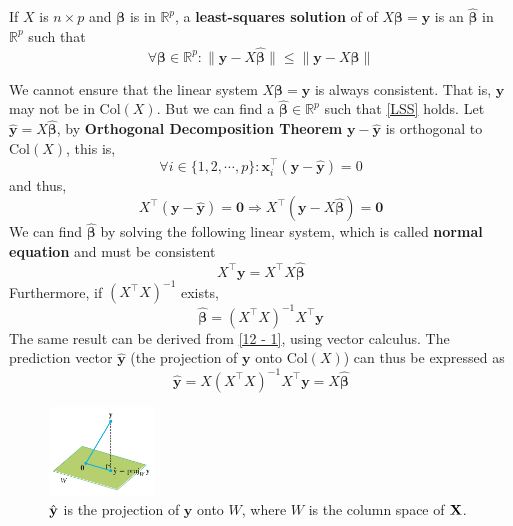 \begin{Def}\label{def-lse}
If $X$ is $n \times p$ and $\pmb{\beta}$ is in $\mathbb{R}^p$, a \textbf{least-squares solution} of of $X\pmb{\beta} = \mathbf{y}$ is an $\hat{\pmb{\beta}}$ in $\mathbb{R}^p$ such that
\begin{equation} \label{LSS}
    \forall \pmb{\beta} \in \mathbb{R}^p: \lVert \mathbf{y} - X\hat{\pmb{\beta}} \rVert \leq \lVert \mathbf{y} - X{\pmb{\beta}} \rVert
\end{equation}
\end{Def}
\noindent We cannot ensure that the linear system $X\pmb{\beta} = \mathbf{y}$ is always consistent. That is, $\mathbf{y}$ may not be in $\text{Col}(X)$. But we can find a $\hat{\pmb{\beta}} \in \mathbb{R}^p$ such that \cref{LSS} holds. Let $\hat{\mathbf{y}} = X\hat{\pmb{\beta}}$, by \textbf{Orthogonal Decomposition Theorem} $\mathbf{y} - \hat{\mathbf{y}}$ is orthogonal to $\text{Col}(X)$, this is,
\begin{equation*}
    \forall i\in \{1, 2, \cdots, p\}: \mathbf{x}_i^{\top} (\mathbf{y} - \hat{\mathbf{y}}) = 0
\end{equation*}
and thus,
\begin{equation*}
    X^{\top}(\mathbf{y} - \hat{\mathbf{y}}) = \mathbf{0} \Longrightarrow X^{\top}  (\mathbf{y} - X\hat{\pmb{\beta}}) = \mathbf{0}
\end{equation*}
We can find $\hat{\pmb{\beta}}$ by solving the following linear system, which is called \textbf{normal equation} and must be consistent
\begin{equation}
    X^{\top}\mathbf{y} = X^{\top}X\hat{\pmb{\beta}}
\end{equation}
Furthermore, if $(X^{\top}X)^{-1}$ exists,
\begin{equation} \label{beta-estimator}
    \hat{\pmb{\beta}} = (X^{\top}X)^{-1}X^{\top}\mathbf{y}
\end{equation}
The same result can be derived from \cref{12 - 1}, using vector calculus.
The prediction vector $\hat{\mathbf{y}}$ (the projection of $\mathbf{y}$ onto $\text{Col}(X)$) can thus be expressed as
\begin{equation}\label{y-estimator}
    \hat{\mathbf{y}} = X(X^{\top}X)^{-1}X^{\top}\mathbf{y} = X\hat{\pmb{\beta}}
\end{equation}
\begin{figure}[ht]
    \centering
    \includegraphics[width=0.25\textwidth]{images/projection-col.jpg}
    \caption{$\Hat{\mathbf{y}}$ is the projection of $\mathbf{y}$ onto $W$, where $W$ is the column space of $\mathbf{X}$.}
    \end{figure}
